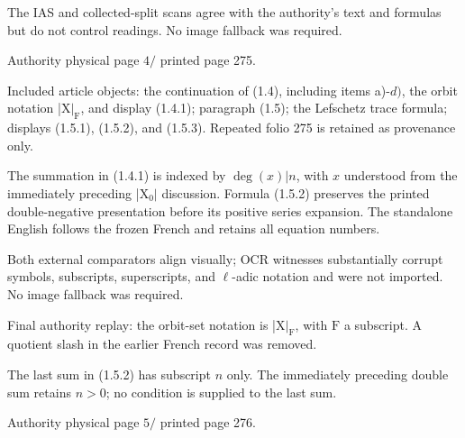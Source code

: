 \documentclass[10pt,leqno]{article}
\begin{document}
\noindent The IAS and collected-split scans agree with the authority’s text and formulas but do not control readings. No image fallback was required.\par

\clearpage

\label{physical-4}\par\smallskip

\noindent Authority physical page \(4 /\) printed page 275.\par

\noindent Included article objects: the continuation of (1.4), including items a)-\(d)\), the orbit notation |\(\mathrm{X}|_{\mathrm{F}}\), and display (1.4.1); paragraph (1.5); the Lefschetz trace formula; displays (1.5.1), (1.5.2), and (1.5.3). Repeated folio 275 is retained as provenance only.\par

\noindent The summation in (1.4.1) is indexed by \(\operatorname{deg}(x)|n\), with \(x\) understood from the immediately preceding |\(\mathrm{X}_{0}|\) discussion. Formula (1.5.2) preserves the printed double-negative presentation before its positive series expansion. The standalone English follows the frozen French and retains all equation numbers.\par

\noindent Both external comparators align visually; OCR witnesses substantially corrupt symbols, subscripts, superscripts, and \(\ell \)-adic notation and were not imported. No image fallback was required.\par

\noindent Final authority replay: the orbit-set notation is |\(\mathrm{X}|_{\mathrm{F}}\), with \(\mathrm{F}\) a subscript. \(\mathrm{A}\) quotient slash in the earlier French record was removed.\par

\noindent The last sum in (1.5.2) has subscript \(n\) only. The immediately preceding double sum retains \(n>0\); no condition is supplied to the last sum.\par

\clearpage

\label{physical-5}\par\smallskip

\noindent Authority physical page \(5 /\) printed page 276.\par
\end{document}
